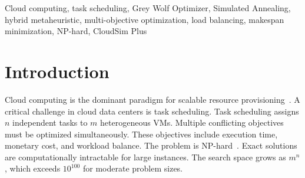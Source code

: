 \documentclass[conference]{IEEEtran}
\begin{document}
\begin{abstract}
Cloud computing task scheduling is a well-known NP-hard optimization problem.
It requires efficient allocation of tasks to virtual machines (VMs).
The allocation must minimize makespan, cost, and workload imbalance simultaneously.
This paper proposes Hybrid GWO-SA, a novel metaheuristic algorithm.
It combines Grey Wolf Optimizer (GWO) for global exploration with Simulated Annealing (SA) for local refinement.
Three key innovations are introduced:
(i)~smart population seeding using FCFS and Min-Min heuristics,
(ii)~bottleneck-guided SA refinement of the top-three wolf leaders,
and (iii)~periodic diversity injection through worst-population re-initialization.
The proposed algorithm is benchmarked against nine algorithms.
These include three classical heuristics, three pure metaheuristics,
and three state-of-the-art hybrid algorithms from 2025.
Four workload scenarios ranging from 100 to 1{,}000 tasks are tested.
Results show that Hybrid GWO-SA achieves the lowest makespan in all scenarios.
Improvements reach 55.50\% over WOA-GS, 26.62\% over PSO-GWO, and 34.45\% over DECSO.
The Degree of Imbalance is reduced to 0.013--0.029.
This represents up to 98.61\% improvement in load fairness.
Statistical validation over 30 Monte Carlo runs confirms significance at $p < 0.001$.
\end{abstract}


\begin{IEEEkeywords}
Cloud computing, task scheduling, Grey Wolf Optimizer, Simulated Annealing, hybrid metaheuristic, multi-objective optimization, load balancing, makespan minimization, NP-hard, CloudSim Plus
\end{IEEEkeywords}


\section{Introduction}

Cloud computing is the dominant paradigm for scalable resource provisioning~\cite{buyya2009cloud}.
A critical challenge in cloud data centers is task scheduling.
Task scheduling assigns $n$ independent tasks to $m$ heterogeneous VMs.
Multiple conflicting objectives must be optimized simultaneously.
These objectives include execution time, monetary cost, and workload balance.
The problem is NP-hard~\cite{garey1979computers}.
Exact solutions are computationally intractable for large instances.
The search space grows as $m^n$, which exceeds $10^{100}$ for moderate problem sizes.
\end{document}
